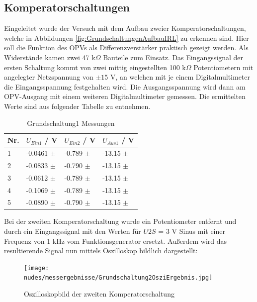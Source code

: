 \documentclass[12pt,a4paper,twoside]{article}
\begin{document}
\subsection{Komperatorschaltungen}

Eingeleitet wurde der Versuch mit dem Aufbau zweier Komperatorschaltungen, welche in Abbildungen \ref{fig:GrundschaltungenAufbauIRL} zu erkennen sind. Hier soll die Funktion des OPVs als Differenzverstärker praktisch gezeigt werden.
Als Widerstände kamen zwei 47 k$\Omega$ Bauteile zum Einsatz. Das Eingangssignal der ersten Schaltung kommt von zwei mittig eingestellten 100 k$\Omega$ Potentiometern mit angelegter Netzspannung von $\pm 15 $ V, an welchen mit je einem Digitalmultimeter die Eingangsspannung festgehalten wird. Die Ausgangsspannung wird dann am OPV-Ausgang mit einem weiteren Digitalmultimeter gemessen. Die ermittelten Werte sind aus folgender Tabelle zu entnehmen.

\begin{table}[H]
    \centering
    \caption{Grundschaltung1 Messungen}
    \label{tab:Grundschaltung1Messungen}
    \begin{tabular}{| l | l | l | l |}
        \hline
        Nr. & $U_{Ein1}$ / V & $U_{Ein2}$ / V & $U_{Aus1}$ / V \\
        \hline
        1 & -0.0461 $\pm$  & -0.789 $\pm$  & -13.15 $\pm$  \\
        2 & -0.0833 $\pm$  & -0.790 $\pm$  & -13.15 $\pm$  \\
        3 & -0.0612 $\pm$  & -0.789 $\pm$  & -13.15 $\pm$  \\
        4 & -0.1069 $\pm$  & -0.789 $\pm$  & -13.15 $\pm$  \\
        5 & -0.0890 $\pm$  & -0.790 $\pm$  & -13.15 $\pm$  \\
        \hline
    \end{tabular}
\end{table}

\noindent
Bei der zweiten Komperatorschaltung wurde ein Potentiometer entfernt und durch ein Eingangssignal mit den Werten für $U{2S}$ = 3 V Sinus mit einer Frequenz von 1 kHz vom Funktionsgenerator ersetzt. Außerdem wird das resultierende Signal nun mittels Oszilloskop bildlich dargestellt:

\begin{figure}[H]
    \centering
    \texttt{[image: nudes/messergebnisse/Grundschaltung2OsziErgebnis.jpg]}
    \caption{Oszilloskopbild der zweiten Komperatorschaltung}
    \label{fig:Grundschaltung2Ergebniss}
\end{figure}
\end{document}
